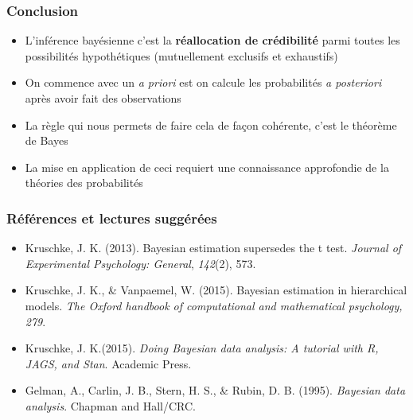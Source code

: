 \documentclass{beamer}
\begin{document}
\begin{frame}
    \frametitle{Conclusion}
    \begin{itemize}
      \item L'inférence bayésienne c'est la \textbf{réallocation de crédibilité}
            parmi toutes les possibilités hypothétiques (mutuellement exclusifs et exhaustifs)
      \pause
      \item On commence avec un \emph{a priori} est on calcule les probabilités
            \emph{a posteriori} après avoir fait des observations
      \pause
      \item La règle qui nous permets de faire cela de façon cohérente, c'est le théorème de Bayes
      \pause
      \item La mise en application de ceci requiert une connaissance approfondie de la théories des probabilités
    \end{itemize}
\end{frame}


\begin{frame}
    \frametitle{Références et lectures suggérées}
    \begin{itemize}
      \item Kruschke, J. K. (2013). Bayesian estimation supersedes the t test.
            \emph{Journal of Experimental Psychology: General}, \emph{142}(2), 573.
      \item Kruschke, J. K., \& Vanpaemel, W. (2015). Bayesian estimation in hierarchical models.
            \emph{The Oxford handbook of computational and mathematical psychology, 279}.
      \item Kruschke, J. K.(2015). \emph{Doing Bayesian data analysis: A tutorial with R, JAGS, and Stan}.
            Academic Press.
      \item Gelman, A., Carlin, J. B., Stern, H. S., \& Rubin, D. B. (1995).
            \emph{Bayesian data analysis}. Chapman and Hall/CRC.
    \end{itemize}
\end{frame}


\end{document}

